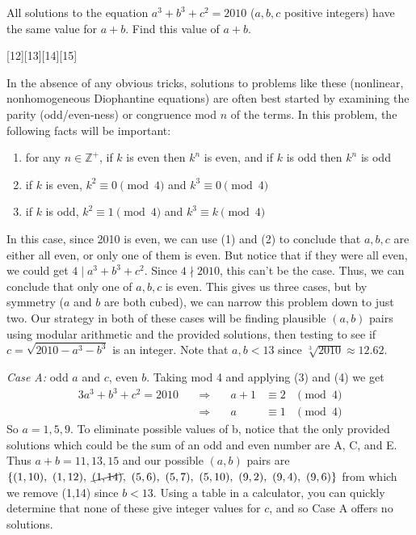 \documentclass[12pt]{article}
\newcounter{problem}
\begin{document}
\begin{problem}
   All solutions to the equation \( a^3 + b^3 + c^2 = 2010 \) (\( a, b, c \) positive integers) have the same value for \( a + b \). Find this value of \( a + b \).
\end{problem}
[12][13][14][15]

\begin{solution}
   In the absence of any obvious tricks, solutions to problems like these (nonlinear, nonhomogeneous Diophantine equations) are often best started by examining the parity (odd/even-ness) or congruence mod $n$ of the terms. In this problem, the following facts will be important:
    \begin{enumerate}[topsep=2mm, label=(\arabic*)]
        \item for any $n\in\mathbb{Z}^+$, if $k$ is even then $k^n$ is even, and if $k$ is odd then $k^n$ is odd 
        \item if $k$ is even, $k^2 \equiv 0 \pmod{4}$ and $k^3 \equiv 0 \pmod{4}$
        \item if $k$ is odd, $k^2 \equiv 1 \pmod{4}$ and $k^3 \equiv k \pmod{4}$
    \end{enumerate}
    In this case, since 2010 is even, we can use (1) and (2) to conclude that $a,b,c$ are either all even, or only one of them is even. But notice that if they were all even, we could get $4 \mid a^3 + b^3 + c^2$. Since $4 \nmid 2010$, this can't be the case. Thus, we can conclude that only one of $a,b,c$ is even. This gives us three cases, but by symmetry ($a$ and $b$ are both cubed), we can narrow this problem down to just two. Our strategy in both of these cases will be finding plausible $(a,b)$ pairs using modular arithmetic and the provided solutions, then testing to see if $c=\sqrt{2010-a^3-b^3}$ is an integer. Note that $a,b < 13$ since $\sqrt[3]{2010}\approx12.62$.
    
    \emph{Case A:} odd $a$ and $c$, even $b$. Taking mod 4 and applying (3) and (4) we get
    \begin{alignat*}{3}
        a^3 + b^3 + c^2 = 2010 \quad &\Rightarrow& \quad a + 1 &\equiv 2 &\pmod 4\\
        &\Rightarrow& \quad a &\equiv 1 &\pmod 4
    \end{alignat*}
    So $a=1,5,9$. To eliminate possible values of b, notice that the only provided solutions which could be the sum of an odd and even number are A, C, and E. Thus $a+b=11,13,15$ and our possible $(a,b)$ pairs are $\{(1,10),\ (1, 12),\ \cancel{(1,14)},\ (5,6),\ (5,7),\ (5,10),\ (9,2),\ (9,4),\ (9,6)\}$ from which we remove (1,14) since $b<13$. Using a table in a calculator, you can quickly determine that none of these give integer values for $c$, and so Case A offers no solutions.
    

\end{solution}
\end{document}
